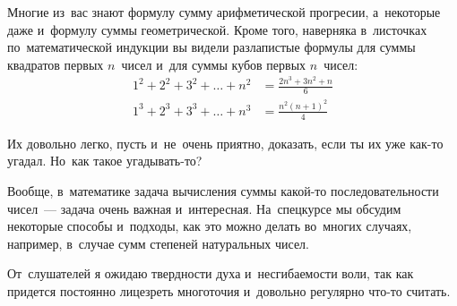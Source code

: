 



Многие из~вас знают формулу сумму арифметической прогресии, а~некоторые даже
и~формулу суммы геометрической.
Кроме того, наверняка в~листочках по~математической индукции вы видели
разлапистые формулы для суммы квадратов первых $n$~чисел и~для суммы кубов
первых $n$~чисел:
\begin{align*}
    1^2 + 2^2 + 3^2 + \ldots + n^2
&=
    \frac{2n^3 + 3n^2 + n}{6}
\\
    1^3 + 2^3 + 3^3 + \ldots + n^3
&=
    \frac{n^2 (n + 1)^2}{4}
\end{align*}

Их довольно легко, пусть и~не~очень приятно, доказать, если ты их уже как-то
угадал.
Но~как такое угадывать-то?

Вообще, в~математике задача вычисления суммы какой-то последовательности
чисел~--- задача очень важная и~интересная.
На~спецкурсе мы обсудим некоторые способы и~подходы, как это можно делать
во~многих случаях, например, в~случае сумм степеней натуральных чисел.

От~слушателей я ожидаю твердности духа и~несгибаемости воли, так как придется
постоянно лицезреть многоточия и~довольно регулярно что-то считать.

